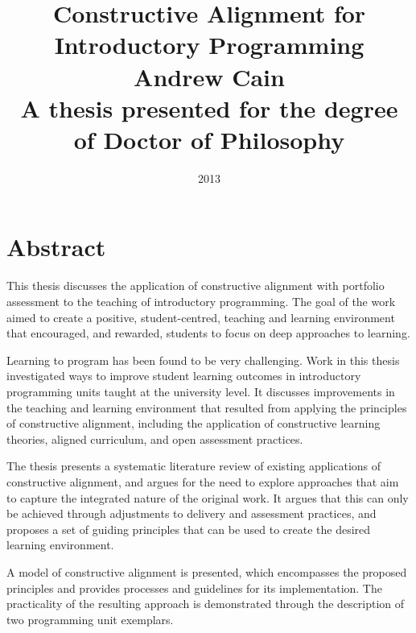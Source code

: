 
\title{ \huge{\textbf{Constructive Alignment for Introductory Programming}} \\[1.2cm]
\vspace{2.2cm} 
\Large{\textbf{Andrew Cain}} \\[1.2cm]
\vspace{2cm}
\large{A thesis presented for the degree of Doctor of Philosophy} \\
\vspace{2.5cm} 
} 

\date{2013}

\maketitle

\cleardoublepage

\chapter*{Abstract}

This thesis discusses the application of constructive alignment with portfolio assessment to the teaching of introductory programming. The goal of the work aimed to create a positive, student-centred, teaching and learning environment that encouraged, and rewarded, students to focus on deep approaches to learning.

Learning to program has been found to be very challenging. Work in this thesis investigated ways to improve student learning outcomes in introductory programming units taught at the university level. It discusses improvements in the teaching and learning environment that resulted from applying the principles of constructive alignment, including the application of constructive learning theories, aligned curriculum, and open assessment practices. 

The thesis presents a systematic literature review of existing applications of constructive alignment, and argues for the need to explore approaches that aim to capture the integrated nature of the original work. It argues that this can only be achieved through adjustments to delivery and assessment practices, and proposes a set of guiding principles that can be used to create the desired learning environment.

A model of constructive alignment is presented, which encompasses the proposed principles and provides processes and guidelines for its implementation. The practicality of the resulting approach is demonstrated through the description of two programming unit exemplars.

